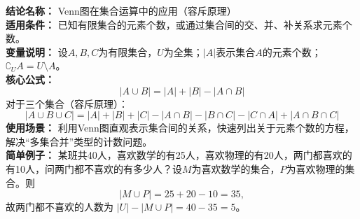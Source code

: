 \textbf{结论名称：} Venn图在集合运算中的应用（容斥原理）\\
\textbf{适用条件：} 已知有限集合的元素个数，或通过集合间的交、并、补关系求元素个数。\\
\textbf{变量说明：} 设$A,B,C$为有限集合，$U$为全集；$|A|$表示集合$A$的元素个数；$\complement_U A = U\setminus A$。\\
\textbf{核心公式：} 
\[
\boxed{|A\cup B| = |A| + |B| - |A\cap B|}
\]
对于三个集合（容斥原理）：
\[
\boxed{|A\cup B\cup C| = |A|+|B|+|C| - |A\cap B| - |B\cap C| - |C\cap A| + |A\cap B\cap C|}
\]
\textbf{使用场景：} 利用Venn图直观表示集合间的关系，快速列出关于元素个数的方程，解决“多集合并”类型的计数问题。\\
\textbf{简单例子：} 某班共40人，喜欢数学的有25人，喜欢物理的有20人，两门都喜欢的有10人，问两门都不喜欢的有多少人？设$M$为喜欢数学的集合，$P$为喜欢物理的集合。则
\[
|M\cup P| = 25+20-10 = 35,
\]
故两门都不喜欢的人数为 $|U| - |M\cup P| = 40-35 = 5$。